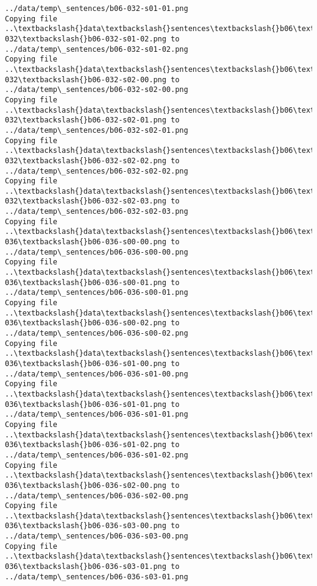 \documentclass[11pt]{article}
\begin{document}
\begin{Verbatim}[commandchars=\\\{\}]
../data/temp\_sentences/b06-032-s01-01.png
Copying file ..\textbackslash{}data\textbackslash{}sentences\textbackslash{}b06\textbackslash{}b06-032\textbackslash{}b06-032-s01-02.png to
../data/temp\_sentences/b06-032-s01-02.png
Copying file ..\textbackslash{}data\textbackslash{}sentences\textbackslash{}b06\textbackslash{}b06-032\textbackslash{}b06-032-s02-00.png to
../data/temp\_sentences/b06-032-s02-00.png
Copying file ..\textbackslash{}data\textbackslash{}sentences\textbackslash{}b06\textbackslash{}b06-032\textbackslash{}b06-032-s02-01.png to
../data/temp\_sentences/b06-032-s02-01.png
Copying file ..\textbackslash{}data\textbackslash{}sentences\textbackslash{}b06\textbackslash{}b06-032\textbackslash{}b06-032-s02-02.png to
../data/temp\_sentences/b06-032-s02-02.png
Copying file ..\textbackslash{}data\textbackslash{}sentences\textbackslash{}b06\textbackslash{}b06-032\textbackslash{}b06-032-s02-03.png to
../data/temp\_sentences/b06-032-s02-03.png
Copying file ..\textbackslash{}data\textbackslash{}sentences\textbackslash{}b06\textbackslash{}b06-036\textbackslash{}b06-036-s00-00.png to
../data/temp\_sentences/b06-036-s00-00.png
Copying file ..\textbackslash{}data\textbackslash{}sentences\textbackslash{}b06\textbackslash{}b06-036\textbackslash{}b06-036-s00-01.png to
../data/temp\_sentences/b06-036-s00-01.png
Copying file ..\textbackslash{}data\textbackslash{}sentences\textbackslash{}b06\textbackslash{}b06-036\textbackslash{}b06-036-s00-02.png to
../data/temp\_sentences/b06-036-s00-02.png
Copying file ..\textbackslash{}data\textbackslash{}sentences\textbackslash{}b06\textbackslash{}b06-036\textbackslash{}b06-036-s01-00.png to
../data/temp\_sentences/b06-036-s01-00.png
Copying file ..\textbackslash{}data\textbackslash{}sentences\textbackslash{}b06\textbackslash{}b06-036\textbackslash{}b06-036-s01-01.png to
../data/temp\_sentences/b06-036-s01-01.png
Copying file ..\textbackslash{}data\textbackslash{}sentences\textbackslash{}b06\textbackslash{}b06-036\textbackslash{}b06-036-s01-02.png to
../data/temp\_sentences/b06-036-s01-02.png
Copying file ..\textbackslash{}data\textbackslash{}sentences\textbackslash{}b06\textbackslash{}b06-036\textbackslash{}b06-036-s02-00.png to
../data/temp\_sentences/b06-036-s02-00.png
Copying file ..\textbackslash{}data\textbackslash{}sentences\textbackslash{}b06\textbackslash{}b06-036\textbackslash{}b06-036-s03-00.png to
../data/temp\_sentences/b06-036-s03-00.png
Copying file ..\textbackslash{}data\textbackslash{}sentences\textbackslash{}b06\textbackslash{}b06-036\textbackslash{}b06-036-s03-01.png to
../data/temp\_sentences/b06-036-s03-01.png

\end{Verbatim}
\end{document}
